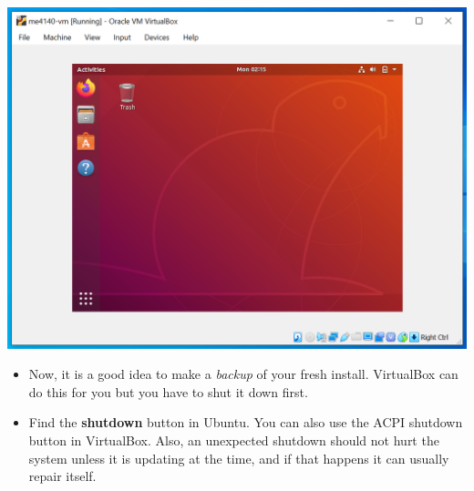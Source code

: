 \documentclass[12pt]{article}
\begin{document}
\begin{description}
\begin{description}
\begin{enumerate}
      		\includegraphics[scale=.55]{Capture26.png}
      		 \begin{itemize}
      		\item Now, it is a good idea to make a {\it backup} of your fresh install. VirtualBox can do this for you but you have to shut it down first.  
         
     		\item Find the {\bf shutdown} button in Ubuntu. You can also use the ACPI shutdown button in VirtualBox. Also, an unexpected shutdown should not hurt the system unless it is updating at the time, and if that happens it can usually repair itself. 
    		\end{itemize}
    		

\end{enumerate}
\end{description}
\end{description}
\end{document}
